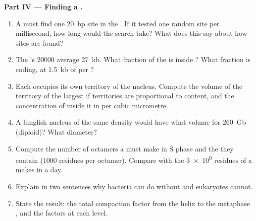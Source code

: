 \begin{problem}
\medskip
\noindent\textbf{Part IV --- Finding a .}
\begin{enumerate}[resume]
  \item A  must find one \qty{20}{bp} site in the .
        If it tested one random site per millisecond, how long would
        the search take? What does this say about how sites are
        found?
  \item The 's \qty{20000}{}  average \qty{27}{kb}. What
        fraction of the  is inside ? What fraction is
        coding, at \qty{1.5}{kb} of  per ?
  \item Each  occupies its own territory of the nucleus.
        Compute the volume of the territory of the largest 
        if territories are proportional to  content, and the
        concentration of  inside it in  per cubic
        micrometre.
  \item A lungfish nucleus of the same  density would have what
        volume for \qty{260}{Gb} (diploid)? What diameter?
  \item Compute the number of  octamers a  must make in S
        phase and the  they contain (\qty{1000}{} residues
        per octamer). Compare with the \qty{3e9}{} residues of 
        a  makes in a day.
  \item Explain in two sentences why bacteria can do without
         and eukaryotes cannot.
  \item State the result: the total compaction factor from the helix
        to the metaphase , and the factors at each level.
\end{enumerate}
\end{problem}
